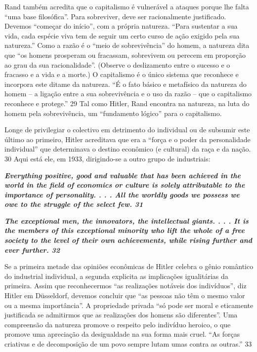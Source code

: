  
\par
 
Rand também acredita que o capitalismo é vulnerável a ataques porque lhe falta “uma base filosófica”. Para sobreviver, deve ser racionalmente justificado. Devemos “começar do início”, com a própria natureza. “Para sustentar a sua vida, cada espécie viva tem de seguir um certo curso de ação exigido pela sua natureza.” Como a razão é o “meio de sobrevivência” do homem, a natureza dita que “os homens prosperam ou fracassam, sobrevivem ou perecem em proporção ao grau da sua racionalidade”. (Observe o deslizamento entre o sucesso e o fracasso e a vida e a morte.) O capitalismo é o único sistema que reconhece e incorpora este ditame da natureza. “É o fato básico e metafísico da natureza do homem – a ligação entre a sua sobrevivência e o uso da razão – que o capitalismo reconhece e protege.”
 {\color{blue} 29}  
Tal como Hitler, Rand encontra na natureza, na luta do homem pela sobrevivência, um “fundamento lógico” para o capitalismo.
 
\par
 
Longe de privilegiar o colectivo em detrimento do individual ou de subsumir este último ao primeiro, Hitler acreditava que era a “força e o poder da personalidade individual” que determinava o destino econômico (e cultural) da raça e da nação.
 {\color{blue} 30}  
Aqui está ele, em 1933, dirigindo-se a outro grupo de industriais:
 
\par
 

 \textbf{\textit{Everything positive, good and valuable that has been achieved in the world in the field of economics or culture is solely attributable to the importance of personality. . . . All the worldly goods we possess we owe to the struggle of the select few. {{\color{blue} 31} } } }  
 
 
\par
 

 
\par
 

 \textbf{\textit{The exceptional men, the innovators, the intellectual giants. . . . It is the members of this exceptional minority who lift the whole of a free society to the level of their own achievements, while rising further and ever further. {{\color{blue} 32} } } }  
 
 
\par
 
Se a primeira metade das opiniões econômicas de Hitler celebra o gênio romântico do industrial individual, a segunda explicita as implicações igualitárias da primeira. Assim que reconhecermos “as realizações notáveis ​​dos indivíduos”, diz Hitler em Düsseldorf, devemos concluir que “as pessoas não têm o mesmo valor ou a mesma importância”. A propriedade privada “só pode ser moral e eticamente justificada se admitirmos que as realizações dos homens são diferentes”. Uma compreensão da natureza promove o respeito pelo indivíduo heroico, o que promove uma apreciação da desigualdade na sua forma mais cruel. “As forças criativas e de decomposição de um povo sempre lutam umas contra as outras.”
 {\color{blue} 33}  

